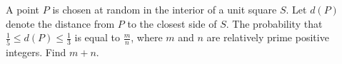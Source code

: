 A point $ P$ is chosen at random in the interior of a unit square $ S$. Let $ d(P)$ denote the distance from $ P$ to the closest side of $ S$. The probability that $ \frac15\le d(P)\le\frac13$ is equal to $ \frac{m}{n}$, where $ m$ and $ n$ are relatively prime positive integers. Find $ m+n$.